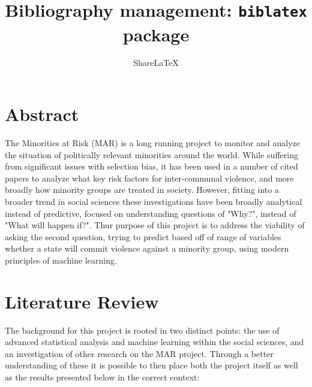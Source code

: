 \documentclass[12pt]{article}
\title{Bibliography management: \texttt{biblatex} package}
\author{Share\LaTeX}
\date{ }
\begin{document}

\newcommand{\hmwkClass}{CS 280}
\newcommand{\hmwkSemester}{Fall 2016}

\newcommand{\hmwkAuthorName}{Brendan Burgess}
\newcommand{\hmwkAuthorID}{brburgess}

\newcommand{\hmwkAssignmentNum}{4}

\newcommand{\hmwkProblemNum}{1}




\noindent

\section{Abstract}
The Minorities at Risk (MAR) is a long running project to monitor and analyze the situation of politically relevant minorities around the world. While suffering from significant issues with selection bias, it has been used in a number of cited papers to analyze what key risk factors for inter-communal violence, and more broadly how minority groups are treated in society. However, fitting into a broader trend in social sciences these investigations have been broadly analytical instead of predictive, focused on understanding questions of {"Why?"}, instead of {"What will happen if?"}. Thur purpose of this project is to address the viability of asking the second question, trying to predict based off of range of variables whether a state will commit violence against a minority group, using modern principles of machine learning.

\section{Literature Review}

The background for this project is rooted in two distinct points: the use of advanced statistical analysis and machine learning within the social sciences, and an investigation of other research on the MAR project. Through a better understanding of these it is possible to then place both the project itself as well as  the results presented below in the correct context:
\end{document}
